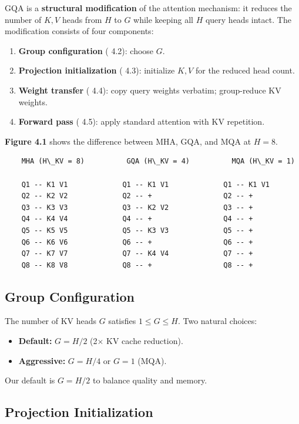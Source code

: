 GQA is a \textbf{structural modification} of the attention mechanism: it reduces 
the number of $K, V$ heads from $H$ to $G$ while keeping all $H$ query heads 
intact. The modification consists of four components:

\begin{enumerate}
\item \textbf{Group configuration} ( 4.2): choose $G$.
\item \textbf{Projection initialization} ( 4.3): initialize $K, V$ for the reduced head count.
\item \textbf{Weight transfer} ( 4.4): copy query weights verbatim; group-reduce KV weights.
\item \textbf{Forward pass} ( 4.5): apply standard attention with KV repetition.

\end{enumerate}
\textbf{Figure 4.1} shows the difference between MHA, GQA, and MQA at $H = 8$.

\begin{lstlisting}
    MHA (H\_KV = 8)          GQA (H\_KV = 4)          MQA (H\_KV = 1)

    Q1 -- K1 V1             Q1 -- K1 V1             Q1 -- K1 V1
    Q2 -- K2 V2             Q2 -- +                 Q2 -- +
    Q3 -- K3 V3             Q3 -- K2 V2             Q3 -- +
    Q4 -- K4 V4             Q4 -- +                 Q4 -- +
    Q5 -- K5 V5             Q5 -- K3 V3             Q5 -- +
    Q6 -- K6 V6             Q6 -- +                 Q6 -- +
    Q7 -- K7 V7             Q7 -- K4 V4             Q7 -- +
    Q8 -- K8 V8             Q8 -- +                 Q8 -- +
\end{lstlisting}

\subsection{Group Configuration}

The number of KV heads $G$ satisfies $1 \le G \le H$. Two natural choices:

\begin{itemize}
\item \textbf{Default:} $G = H / 2$ (2$\times$ KV cache reduction).
\item \textbf{Aggressive:} $G = H / 4$ or $G = 1$ (MQA).

\end{itemize}
Our default is $G = H / 2$ to balance quality and memory.

\subsection{Projection Initialization}

